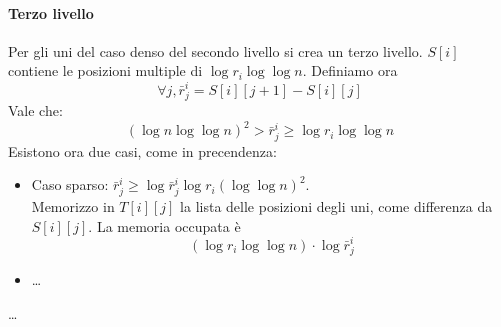 \paragraph{Terzo livello}
Per gli uni del caso denso del secondo livello si crea un terzo livello.
$S[i]$ contiene le posizioni multiple di $\log r_i \log \log n$.
Definiamo ora
$$\forall j, \bar{r}_j^i = S[i][j+1] - S[i][j]$$
Vale che:
$$ (\log n \log \log n)^2 > \bar{r}_j^i \geq \log r_i \log \log n$$
Esistono ora due casi, come in precendenza:
\begin{itemize}
    \item Caso sparso: $\bar{r}_j^i \geq \log \bar{r}_j^i \log r_i (\log \log n)^2$.\\
    Memorizzo in $T[i][j]$ la lista delle posizioni degli uni, come differenza da $S[i][j]$.
    La memoria occupata è 
    $$(\log r_i \log \log n)\cdot \log \bar{r}_j^i $$
    \item \dots
\end{itemize}
\dots